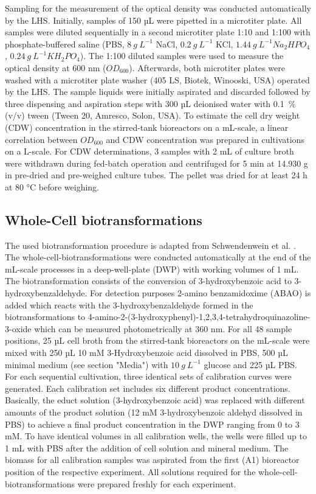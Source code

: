\documentclass[sn-standardnature]{sn-jnl}%
\theoremstyle{thmstyleone}%
\theoremstyle{thmstyletwo}%
\theoremstyle{thmstylethree}%
\begin{document}
Sampling for the measurement of the optical density was conducted automatically by the LHS.
Initially, samples of 150 µL were pipetted in a microtiter plate.
All samples were diluted sequentially in a second microtiter plate 1:10 and 1:100 with phosphate-buffered saline (PBS, $8\ g\ L^{-1}$ NaCl, $0.2\ g\ L^{-1}$ KCl, $1.44\ g\ L^{-1} Na_{2}HPO_{4}$, $0.24\ g\ L^{-1} KH_{2}PO_{4}$).
The 1:100 diluted samples were used to measure the optical density at 600 nm ($OD_{600}$).
Afterwards, both microtiter plates were washed with a microtiter plate washer (405 LS, Biotek, Winooski, USA) operated by the LHS.
The sample liquids were initially aspirated and discarded followed by three dispensing and aspiration steps with 300 µL deionised water with 0.1~\% (v/v) tween (Tween 20, Amresco, Solon, USA).
To estimate the cell dry weight (CDW) concentration in the stirred-tank bioreactors on a mL-scale, a linear correlation between $OD_{600}$ and CDW concentration was prepared in cultivations on a L-scale.
For CDW determinations, 3 samples with 2 mL of culture broth were withdrawn during fed-batch operation and centrifuged for 5 min at 14.930 g in pre-dried and pre-weighed culture tubes.
The pellet was dried for at least 24 h at 80 °C before weighing.


\subsection{Whole-Cell biotransformations}
The used biotransformation procedure is adapted from Schwendenwein et al. \cite{schwendenwein2019random}.
The whole-cell-biotransformations were conducted automatically at the end of the mL-scale processes in a deep-well-plate (DWP) with working volumes of 1 mL.
The biotransformation consists of the conversion of 3-hydroxybenzoic acid to 3-hydroxybenzaldehyde.
For detection purposes 2-amino benzamidoxime (ABAO) is added which reacts with the 3-hydroxybenzaldehyde formed in the biotransformations to 4-amino-2-(3-hydroxyphenyl)-1,2,3,4-tetrahydroquinazoline-3-oxide which can be measured photometrically at 360 nm.
For all 48 sample positions, 25 µL cell broth from the stirred-tank bioreactors on the mL-scale were mixed with 250 µL 10 mM 3-Hydroxybenzoic acid dissolved in PBS, 500 µL minimal  medium (see section "Media") with $10\ g\ L^{-1}$ glucose and 225 µL PBS.
For each sequential cultivation, three identical sets of calibration curves were generated.
Each calibration set includes six different product concentrations.
Basically, the educt solution (3-hydroxybenzoic acid) was replaced with different amounts of the product solution (12 mM 3-hydroxybenzoic aldehyd dissolved in PBS) to achieve a final product concentration in the DWP ranging from 0 to 3 mM.
To have identical volumes in all calibration wells, the wells were filled up to 1 mL with PBS after the addition of cell solution and mineral medium.
The biomass for all calibration samples was aspirated from the first (A1) bioreactor position of the respective experiment.
All solutions required for the whole-cell-biotransformations were prepared freshly for each experiment.
\end{document}
